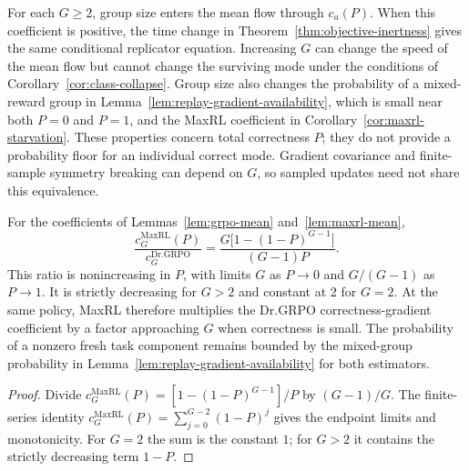 \begin{remark}
\label{rem:group-size-inert}
For each $G\ge2$, group size enters the mean flow through $c_a(P)$.
When this coefficient is positive, the time change in
Theorem~\ref{thm:objective-inertness} gives the same conditional replicator
equation. Increasing $G$ can change the speed of the mean flow but cannot
change the surviving mode under the conditions of
Corollary~\ref{cor:class-collapse}.
Group size also changes the probability of a mixed-reward group in
Lemma~\ref{lem:replay-gradient-availability}, which is small near both
$P=0$ and $P=1$, and the MaxRL coefficient in
Corollary~\ref{cor:maxrl-starvation}. These properties concern total
correctness $P$; they do not provide a probability floor for an individual
correct mode. Gradient covariance and finite-sample symmetry breaking can depend on $G$,
so sampled updates need not share this equivalence.
\end{remark}

\begin{corollary}
\enforcehalffinalproseline
\label{cor:maxrl-starvation}
For the coefficients of Lemmas~\ref{lem:grpo-mean} and~\ref{lem:maxrl-mean},
\[
 \frac{c_G^{\mathrm{MaxRL}}(P)}{c_G^{\mathrm{Dr.GRPO}}}
 =\frac{G\big[1-(1-P)^{G-1}\big]}{(G-1)P}.
\]
This ratio is nonincreasing in $P$, with limits $G$ as $P\to0$ and
$G/(G-1)$ as $P\to1$. It is strictly decreasing for $G>2$ and constant
at $2$ for $G=2$. At the same policy, MaxRL therefore multiplies the
Dr.GRPO correctness-gradient coefficient by a factor approaching $G$ when
correctness is small. The probability of a nonzero fresh task component
remains bounded by the mixed-group probability in
Lemma~\ref{lem:replay-gradient-availability} for both estimators.
\end{corollary}

\begin{proof}
\enforcehalffinalproseline
Divide $c_G^{\mathrm{MaxRL}}(P)=[1-(1-P)^{G-1}]/P$ by $(G-1)/G$.
The finite-series identity
$c_G^{\mathrm{MaxRL}}(P)=\sum_{j=0}^{G-2}(1-P)^j$
gives the endpoint limits and monotonicity. For $G=2$ the sum is the
constant $1$; for $G>2$ it contains the strictly decreasing term $1-P$.
\end{proof}

